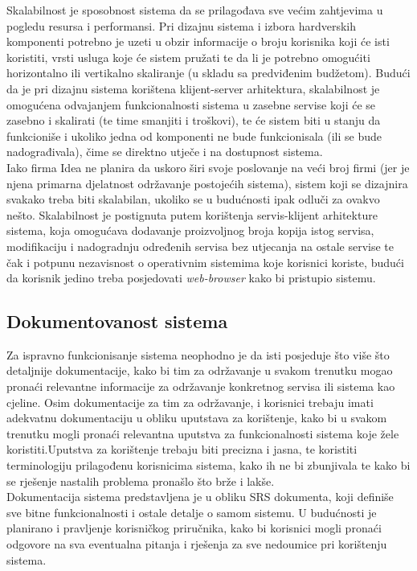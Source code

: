 \documentclass[12pt,a4paper]{article}
\begin{document}
\quad Skalabilnost je sposobnost sistema da se prilagođava sve većim zahtjevima u pogledu resursa i performansi. Pri dizajnu sistema i izbora hardverskih komponenti potrebno je uzeti u obzir informacije o broju korisnika koji će isti koristiti, vrsti usluga koje će sistem pružati te da li je potrebno omogućiti horizontalno ili vertikalno skaliranje (u skladu sa predviđenim budžetom). Budući da je pri dizajnu sistema korištena klijent-server arhitektura, skalabilnost je omogućena odvajanjem funkcionalnosti sistema u zasebne servise koji će se zasebno i skalirati (te time smanjiti i troškovi), te će sistem biti u stanju da funkcioniše i ukoliko jedna od komponenti ne bude funkcionisala (ili se bude nadograđivala), čime se direktno utječe i na dostupnost sistema. \\

Iako firma Idea ne planira da uskoro širi svoje poslovanje na veći broj firmi (jer je njena primarna djelatnost održavanje postojećih sistema), sistem koji se dizajnira svakako treba biti skalabilan, ukoliko se u budućnosti ipak odluči za ovakvo nešto. Skalabilnost je postignuta putem korištenja servis-klijent arhitekture sistema, koja omogućava dodavanje proizvoljnog broja kopija istog servisa, modifikaciju i nadogradnju određenih servisa bez utjecanja na ostale servise te čak i potpunu nezavisnost o operativnim sistemima koje korisnici koriste, budući da korisnik jedino treba posjedovati \textit{web-browser} kako bi pristupio sistemu.

\subsection{Dokumentovanost sistema}

\quad Za ispravno funkcionisanje sistema neophodno je da isti posjeduje što više što detaljnije dokumentacije, kako bi tim za održavanje u svakom trenutku mogao pronaći relevantne informacije za održavanje konkretnog servisa ili sistema kao cjeline. Osim dokumentacije za tim za održavanje, i korisnici trebaju imati adekvatnu dokumentaciju u obliku uputstava za korištenje, kako bi u svakom trenutku mogli pronaći relevantna uputstva za funkcionalnosti sistema koje žele koristiti.Uputstva za korištenje trebaju biti precizna i jasna, te koristiti terminologiju prilagođenu korisnicima sistema, kako ih ne bi zbunjivala te kako bi se rješenje nastalih problema pronašlo što brže i lakše. \\

Dokumentacija sistema predstavljena je u obliku SRS dokumenta, koji definiše sve bitne funkcionalnosti i ostale detalje o samom sistemu. U budućnosti je planirano i pravljenje korisničkog priručnika, kako bi korisnici mogli pronaći odgovore na sva eventualna pitanja i rješenja za sve nedoumice pri korištenju sistema.
\end{document}
